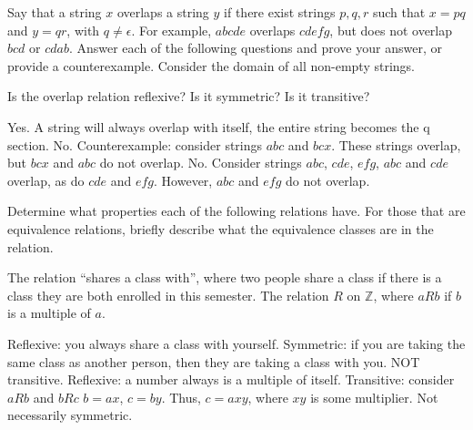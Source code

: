 \documentclass[solution, letterpaper]{cs20inclass}
\begin{document}
\problem Say that a string $x$ overlaps a string $y$ if there exist strings $p,q,r$ such that $x = pq$ and $y = qr$, with $q \neq \epsilon$. For example, $abcde$ overlaps $cdefg$, but does not overlap $bcd$ or $cdab$. Answer each of the following questions and prove your answer, or provide a counterexample. Consider the domain of all non-empty strings. 

\subproblem Is the overlap relation reflexive? 
\subproblem Is it symmetric?
\subproblem Is it transitive?

\begin{solution}
\subsolution Yes. A string will always overlap with itself, the entire string becomes the q section. 
\subsolution No. Counterexample: consider strings $abc$ and $bcx$. These strings overlap, but $bcx$ and $abc$ do not overlap. 
\subsolution No. Consider strings $abc$, $cde$, $efg$, $abc$ and $cde$ overlap, as do $cde$ and $efg$. However, $abc$ and $efg$ do not overlap. 

 
\end{solution}

\problem [BONUS] Determine what properties each of the following relations have. For those that are equivalence relations, briefly describe what the equivalence classes are in the relation.

\subproblem The relation ``shares a class with'', where two people share a class if there is a class they are both enrolled in this semester.
\subproblem The relation $R$ on $\mathbb{Z}$, where $aRb$ if $b$ is a multiple of $a$.


\begin{solution}
\subsolution Reflexive: you always share a class with yourself. Symmetric: if you are taking the same class as another person, then they are taking a class with you. NOT transitive. 
\subsolution Reflexive: a number always is a multiple of itself.  Transitive: consider $aRb$ and  $bRc$ $b = ax$, $c = by$. Thus, $c = axy$, where $xy$ is some multiplier. Not necessarily symmetric. 

\end{solution}
\end{document}
